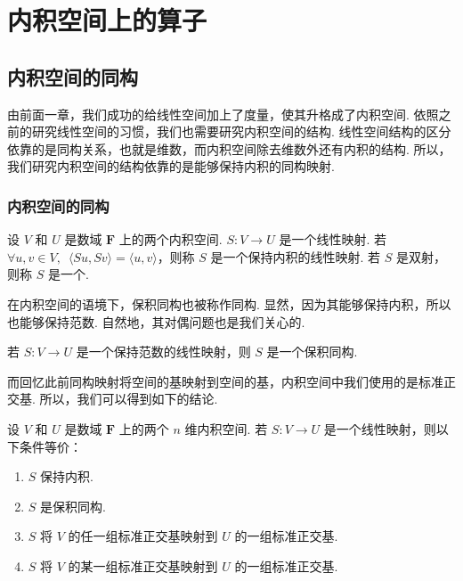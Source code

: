 \chapter{内积空间上的算子}

\section{内积空间的同构}

由前面一章，我们成功的给线性空间加上了度量，使其升格成了内积空间. 依照之前的研究线性空间的习惯，我们也需要研究内积空间的结构. 线性空间结构的区分依靠的是同构关系，也就是维数，而内积空间除去维数外还有内积的结构. 所以，我们研究内积空间的结构依靠的是能够保持内积的同构映射.

\subsection{内积空间的同构}

\begin{definition}{}{}
    设 $ V $ 和 $ U $ 是数域 $ \mathbf{F} $ 上的两个内积空间. $ S: V \rightarrow U $ 是一个线性映射. 若 $ \forall u, v \in V,\enspace \langle Su, Sv \rangle = \langle u, v \rangle $，则称 $ S $ 是一个保持内积的线性映射. 若 $ S $ 是双射，则称 $ S $ 是一个.
\end{definition}

在内积空间的语境下，保积同构也被称作同构. 显然，因为其能够保持内积，所以也能够保持范数. 自然地，其对偶问题也是我们关心的.

\begin{theorem}{}{}
    若 $ S : V \rightarrow U $ 是一个保持范数的线性映射，则 $ S $ 是一个保积同构.
\end{theorem}

而回忆此前同构映射将空间的基映射到空间的基，内积空间中我们使用的是标准正交基. 所以，我们可以得到如下的结论.

\begin{theorem}{}{}
    设 $ V $ 和 $ U $ 是数域 $ \mathbf{F} $ 上的两个 $ n $ 维内积空间. 若 $ S : V \rightarrow U $ 是一个线性映射，则以下条件等价：
    \begin{enumerate}
        \item $ S $ 保持内积.
        \item $ S $ 是保积同构.
        \item $ S $ 将 $ V $ 的任一组标准正交基映射到 $ U $ 的一组标准正交基.
        \item $ S $ 将 $ V $ 的某一组标准正交基映射到 $ U $ 的一组标准正交基.
    \end{enumerate}
\end{theorem}

